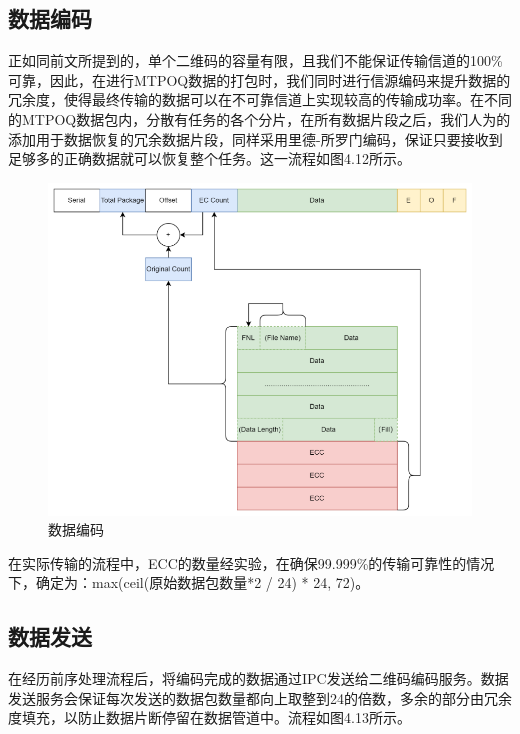 \subsection{数据编码}

正如同前文所提到的，单个二维码的容量有限，且我们不能保证传输信道的100\%可靠，因此，在进行MTPOQ数据的打包时，我们同时进行信源编码来提升数据的冗余度，使得最终传输的数据可以在不可靠信道上实现较高的传输成功率。在不同的MTPOQ数据包内，分散有任务的各个分片，在所有数据片段之后，我们人为的添加用于数据恢复的冗余数据片段，同样采用里德-所罗门编码，保证只要接收到足够多的正确数据就可以恢复整个任务。这一流程如图4.12所示。

\begin{figure}[!htbp]
\centering
\includegraphics[scale=1.2]{figures/QR_Co.png}
\caption{数据编码}
\end{figure}

在实际传输的流程中，ECC的数量经实验，在确保99.999\%的传输可靠性的情况下，确定为：max(ceil(原始数据包数量*2 / 24) * 24, 72)。

\subsection{数据发送}

在经历前序处理流程后，将编码完成的数据通过IPC发送给二维码编码服务。数据发送服务会保证每次发送的数据包数量都向上取整到24的倍数，多余的部分由冗余度填充，以防止数据片断停留在数据管道中。流程如图4.13所示。

